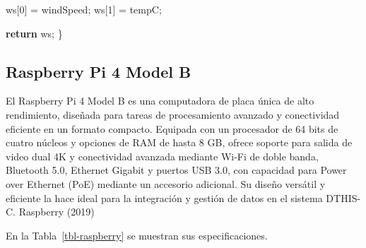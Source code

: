 \documentclass[
  letterpaper,
]{scrbook}
\newenvironment{Shaded}{\begin{snugshade}}{\end{snugshade}}
\newcommand{\ControlFlowTok}[1]{\textcolor[rgb]{0.00,0.23,0.31}{\textbf{#1}}}
\newcommand{\DecValTok}[1]{\textcolor[rgb]{0.68,0.00,0.00}{#1}}
\newcommand{\NormalTok}[1]{\textcolor[rgb]{0.00,0.23,0.31}{#1}}
\newcommand{\OperatorTok}[1]{\textcolor[rgb]{0.37,0.37,0.37}{#1}}
\begin{document}
\begin{Shaded}
\begin{Highlighting}[]
\NormalTok{  ws[}\DecValTok{0}\NormalTok{] }\OperatorTok{=}\NormalTok{ windSpeed}\OperatorTok{;}
\NormalTok{  ws[}\DecValTok{1}\NormalTok{] }\OperatorTok{=}\NormalTok{ tempC}\OperatorTok{;}
  
  \ControlFlowTok{return}\NormalTok{ ws}\OperatorTok{;}
\NormalTok{\}}
\end{Highlighting}
\end{Shaded}

\subsection{Raspberry Pi 4 Model B}\label{raspberry-pi-4-model-b}

El Raspberry Pi 4 Model B es una computadora de placa única de alto
rendimiento, diseñada para tareas de procesamiento avanzado y
conectividad eficiente en un formato compacto. Equipada con un
procesador de 64 bits de cuatro núcleos y opciones de RAM de hasta 8 GB,
ofrece soporte para salida de video dual 4K y conectividad avanzada
mediante Wi-Fi de doble banda, Bluetooth 5.0, Ethernet Gigabit y puertos
USB 3.0, con capacidad para Power over Ethernet (PoE) mediante un
accesorio adicional. Su diseño versátil y eficiente la hace ideal para
la integración y gestión de datos en el sistema DTHIS-C. Raspberry
(2019)

En la Tabla~\ref{tbl-raspberry} se muestran sus especificaciones.
\end{document}
